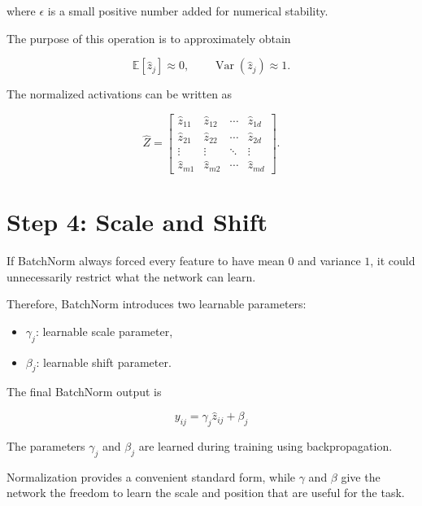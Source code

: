 \documentclass[11pt,a4paper]{article}
\begin{document}
	where $\epsilon$ is a small positive number added for numerical stability.
	
	The purpose of this operation is to approximately obtain
	
	\begin{equation}
		\mathbb{E}[\hat{z}_j]\approx 0,
		\qquad
		\operatorname{Var}(\hat{z}_j)\approx 1.
	\end{equation}
	
	The normalized activations can be written as
	
	\begin{equation}
		\hat{Z} =
		\begin{bmatrix}
			\hat{z}_{11} & \hat{z}_{12} & \cdots & \hat{z}_{1d}\\
			\hat{z}_{21} & \hat{z}_{22} & \cdots & \hat{z}_{2d}\\
			\vdots & \vdots & \ddots & \vdots\\
			\hat{z}_{m1} & \hat{z}_{m2} & \cdots & \hat{z}_{md}
		\end{bmatrix}.
	\end{equation}
	
	\section{Step 4: Scale and Shift}
	
	If BatchNorm always forced every feature to have mean $0$ and variance
	$1$, it could unnecessarily restrict what the network can learn.
	
	Therefore, BatchNorm introduces two learnable parameters:
	
	\begin{itemize}[leftmargin=1.5em]
		\item $\gamma_j$: learnable scale parameter,
		\item $\beta_j$: learnable shift parameter.
	\end{itemize}
	
	The final BatchNorm output is
	
	\begin{equation}
		\boxed{
			y_{ij} = \gamma_j\hat{z}_{ij}+\beta_j
		}
	\end{equation}
	
	The parameters $\gamma_j$ and $\beta_j$ are learned during training using
	backpropagation.
	
	\begin{intuition}
		Normalization provides a convenient standard form, while $\gamma$ and
		$\beta$ give the network the freedom to learn the scale and position that
		are useful for the task.
	\end{intuition}
	
\end{document}
